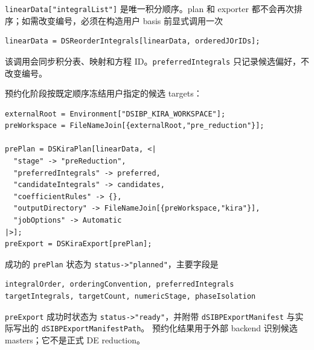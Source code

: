 ﻿\documentclass[a4paper,11pt]{article}
\begin{document}
\texttt{linearData["integralList"]} 是唯一积分顺序。plan 和 exporter 都不会再次排序；如需改变编号，必须在构造用户 basis 前显式调用一次
\begin{verbatim}
linearData = DSReorderIntegrals[linearData, orderedJOrIDs];
\end{verbatim}
该调用会同步积分表、映射和方程 ID。\texttt{preferredIntegrals} 只记录候选偏好，不改变编号。

预约化阶段按既定顺序冻结用户指定的候选 targets：
\begin{verbatim}
externalRoot = Environment["DSIBP_KIRA_WORKSPACE"];
preWorkspace = FileNameJoin[{externalRoot,"pre_reduction"}];

prePlan = DSKiraPlan[linearData, <|
  "stage" -> "preReduction",
  "preferredIntegrals" -> preferred,
  "candidateIntegrals" -> candidates,
  "coefficientRules" -> {},
  "outputDirectory" -> FileNameJoin[{preWorkspace,"kira"}],
  "jobOptions" -> Automatic
|>];
preExport = DSKiraExport[prePlan];
\end{verbatim}
成功的 \texttt{prePlan} 状态为 \texttt{status->"planned"}，主要字段是
\begin{verbatim}
integralOrder, orderingConvention, preferredIntegrals
targetIntegrals, targetCount, numericStage, phaseIsolation
\end{verbatim}
\texttt{preExport} 成功时状态为 \texttt{status->"ready"}，并附带
\texttt{dSIBPExportManifest} 与实际写出的 \texttt{dSIBPExportManifestPath}。
预约化结果用于外部 backend 识别候选 masters；它不是正式 DE reduction。
\end{document}
